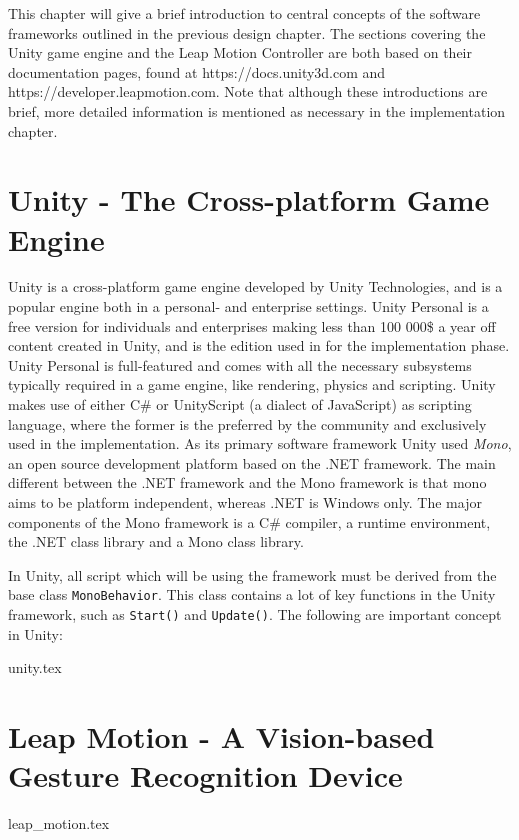 This chapter will give a brief introduction to central concepts of the software frameworks outlined in the previous design chapter.
The sections covering the Unity game engine and the Leap Motion Controller are both based on their documentation pages, found at 
https://docs.unity3d.com and https://developer.leapmotion.com.
Note that although these introductions are brief, more detailed information is mentioned as necessary in the implementation chapter.

\section{Unity - The Cross-platform Game Engine}
Unity is a cross-platform game engine developed by Unity Technologies, and is a popular engine both in a personal- and enterprise settings.
Unity Personal is a free version for individuals and enterprises making less than 100 000\$ a year off content created in Unity, and is the 
edition used in for the implementation phase.
Unity Personal is full-featured and comes with all the necessary subsystems typically required in a game engine, like rendering, physics and scripting.
Unity makes use of either C\# or UnityScript (a dialect of JavaScript) as scripting language, where the former is the preferred by the community and 
exclusively used in the implementation. As its primary software framework Unity used \textit{Mono}, an open source development platform based on the .NET
framework. The main different between the .NET framework and the Mono framework is that mono aims to be platform independent, whereas .NET is Windows only.
The major components of the Mono framework is a C\# compiler, a runtime environment, the .NET class library and a Mono class library.

In Unity, all script which will be using the framework must be derived from the base class \texttt{MonoBehavior}. 
This class contains a lot of key functions in the Unity framework, such as \texttt{Start()} and \texttt{Update()}. 
The following are important concept in Unity:

{unity.tex}

\section{Leap Motion - A Vision-based Gesture Recognition Device}
{leap_motion.tex}